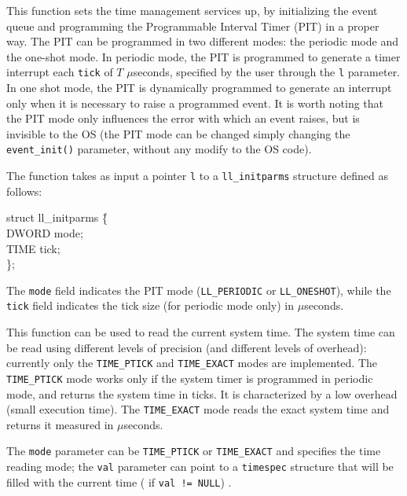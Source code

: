 \documentclass[a4paper]{report}
\begin{document}

This function sets the time management services up, by initializing
the event queue and programming the Programmable Interval Timer (PIT)
in a proper way. The PIT can be programmed in two
different modes: the periodic mode and the one-shot mode. In periodic
mode, the PIT is programmed to generate a timer interrupt each {\tt tick}
of $T$ $\mu$seconds, specified by the user through the {\tt l}
parameter. In one shot mode, the PIT is dynamically programmed to
generate an interrupt only when it is necessary to raise a
programmed event. It is worth noting that the PIT mode only
influences the error with which an event raises, but is invisible to
the OS (the PIT mode can be changed simply changing the {\tt event\_init()}
parameter, without any modify to the OS code).

The function takes as input a pointer {\tt l} to a {\tt ll\_initparms}
structure defined as follows:

\begin{minipage}[t]{15cm}
\begin{tt}
\begin{tabbing}
struct ll\_initparms \= \{      \\
\>      DWORD mode;             \\
\>      TIME tick;              \\
\}; 
\end{tabbing}
\end{tt}
\end{minipage}

The {\tt mode} field indicates the PIT mode ({\tt LL\_PERIODIC} or
{\tt LL\_ONESHOT}), while the {\tt tick} field indicates the tick size
(for periodic mode only) in $\mu$seconds.


This function can be used to read the current system time. The system
time can be read using different levels of precision (and different
levels of overhead): currently only the {\tt TIME\_PTICK} and
{\tt TIME\_EXACT} modes are implemented. The {\tt TIME\_PTICK} mode
works only if the system timer is programmed in periodic mode, and
returns the system time in ticks. It is characterized by a low
overhead (small execution time). The {\tt TIME\_EXACT} mode reads the
exact system time and returns it measured in $\mu$seconds.

The {\tt mode} parameter can be {\tt TIME\_PTICK} or {\tt TIME\_EXACT} 
and specifies the time reading mode; the {\tt val} parameter can 
point to a {\tt timespec} structure that will be filled
with the current time ( if {\tt val != NULL}) .
\end{document}
